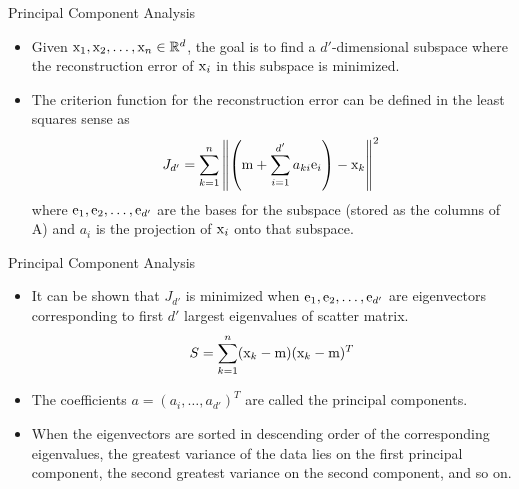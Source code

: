 \begin{frame}{Principal Component Analysis}
\begin{itemize}
\item Given ${\rm x}_1,{\rm x}_2,\ldots,{\rm x}_n\in \mathbb{R}^d$, the goal is to find a $d'$-dimensional
subspace where the reconstruction error of ${\rm x}_i$ in this
subspace is minimized.
\item The criterion function for the reconstruction error can be defined in the least squares sense as
\begin{equation}
{J_{d'}} = \sum\limits_{k = 1}^n {{{\left\| {\left( {{\rm m} + \sum\limits_{i = 1}^{d'} {{a_{ki}}{{\rm e}_i}} } \right) - {{\rm x}_k}} \right\|}^2}} \nonumber
\end{equation}
where ${\rm e}_1,{\rm e}_2,\ldots,{\rm e}_{d'}$ are the bases for the subspace (stored as the columns of A) and ${a}_i$ is the projection of ${\rm x}_i$ onto that subspace.
\end{itemize}
\end{frame}

\begin{frame}{Principal Component Analysis}
\begin{itemize}
\item It can be shown that $J_{d'}$ is minimized when ${\rm e}_1,{\rm e}_2,\ldots,{\rm e}_{d'}$ are eigenvectors corresponding to first $d'$ largest eigenvalues of scatter matrix.
\[S = \sum_{k=1}^n({\rm x}_k-{\rm m})({\rm x}_k-{\rm m})^T\]
\item The coefficients ${ a} = ({a}_i,\ldots,{a}_{d'})^T$ are called the principal components.
\item When the eigenvectors are sorted in descending order of
the corresponding eigenvalues, the greatest variance of the
data lies on the first principal component, the second
greatest variance on the second component, and so on.
\end{itemize}
\end{frame}

